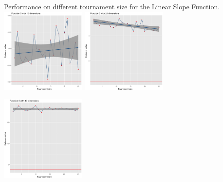 \documentclass[portrait,final,a0paper,fontscale=0.277]{baposter}
\begin{document}
\begin{poster}
{\begin{center}
				\large{Performance on different tournament size for the Linear Slope Function.}\\
				\raggedleft
				\includegraphics[width=0.32\textwidth]{5dim_10.png}
				\centering
				\includegraphics[width=0.32\textwidth]{5dim_20.png}
				\raggedright
				\includegraphics[width=0.32\textwidth]{5dim_40.png}
				

\end{center}}
\end{poster}
\end{document}
